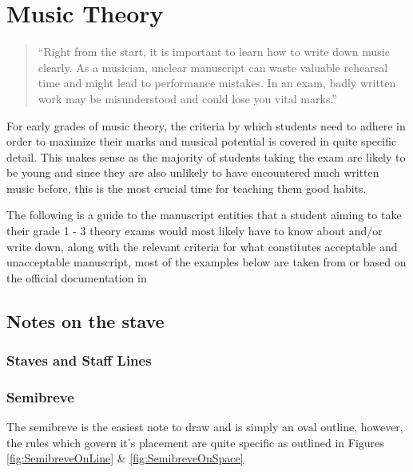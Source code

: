 \section{Music Theory}

\blockquote{``Right from the start, it is important to learn how to write down music clearly. As a musician, unclear manuscript can waste valuable rehearsal time and might lead to performance mistakes. In an exam, badly written work may be misunderstood and could lose you vital marks.'' \parencite{taylor1989ab}}

For early grades of music theory, the criteria by which students need to adhere in order to maximize their marks and musical potential is covered in quite specific detail. This makes sense as the majority of students taking the exam are likely to be young and since they are also unlikely to have encountered much written music before, this is the most crucial time for teaching them good habits.

The following is a guide to the manuscript entities that a student aiming to take their grade 1 - 3 theory exams would most likely have to know about and/or write down, along with the relevant criteria for what constitutes acceptable and unacceptable manuscript, most of the examples below are taken from or based on the official documentation in \parencite{taylor2008music}


\subsection{Notes on the stave}

\subsubsection{Staves and Staff Lines}
\label{sec:music-theory-stave}

\subsubsection{Semibreve}

The semibreve is the easiest note to draw and is simply an oval outline, however, the rules which govern it's placement are quite specific as outlined in Figures \cref{fig:SemibreveOnLine} \& \cref{fig:SemibreveOnSpace}

